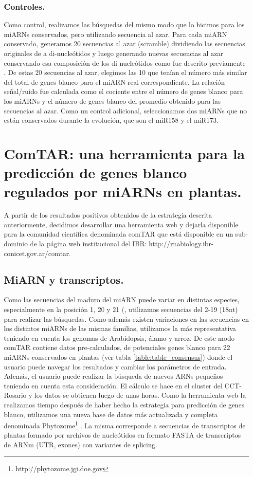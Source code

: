 \subsubsection{Controles.}
Como control, realizamos las búsquedas del mismo modo que lo hicimos para los miARNs conservados, pero utilizando secuencia al azar.
Para cada miARN conservado, generamos 20 secuencias al azar (scramble) dividiendo las secuencias originales de a di-nucleótidos y luego generando nuevas secuencias al azar conservando esa composición de los di-nucleótidos como fue descrito previamente \citep{JonesRhoades2004787}.
De estas 20 secuencias al azar, elegimos las 10 que tenían el número más similar del total de genes blanco para el miARN real correspondiente.
La relación señal/ruido fue calculada como el cociente entre el número de genes blanco para los miARNs y el número de genes blanco del promedio obtenido para las secuencias al azar.
Como un control adicional, seleccionamos dos miARNs que no están conservados durante la evolución, que son el miR158 y el miR173.


\section{ComTAR: una herramienta para la predicción de genes blanco regulados por miARNs en plantas.}

A partir de los resultados positivos obtenidos de la estrategia descrita anteriormente, decidimos desarrollar una herramienta web y dejarla disponible para la comunidad científica denominada comTAR que está disponible en un sub-dominio de la página web institucional del IBR: http://rnabiology.ibr-conicet.gov.ar/comtar.

\subsection{MiARN y transcriptos.}
Como las secuencias del maduro del miARN puede variar en distintas especies, especialmente en la posición 1, 20 y 21 (\citep{Chorostecki05072012}, utilizamos secuencias del 2-19 (18nt) para realizar las búsquedas.
Como además existen variaciones en las secuencias en los distintos miARNs de las mismas familias, utilizamos la más representativa teniendo en cuenta los genomas de Arabidopsis, álamo y arroz. 
De este modo comTAR contiene datos pre-calculados, de potenciales genes blanco para 22 miARNs conservados en plantas (ver tabla \ref{table:table_consensus}) donde el usuario puede navegar los resultados y cambiar los parámetros de entrada.
Además, el usuario puede realizar la búsqueda de nuevos ARNs pequeños teniendo en cuenta esta consideración. El cálculo se hace en el cluster del CCT-Rosario y los datos se obtienen luego de unas horas.
Como la herramienta web la realizamos tiempo después de haber hecho la estrategia para predicción de genes blanco, utilizamos una nueva base de datos más actualizada y completa denominada Phytozome\footnote{http://phytozome.jgi.doe.gov} \citep{Goodstein2012}. 
La misma corresponde a secuencias de transcriptos de plantas formado por archivos de nucleótidos en formato FASTA de transcriptos de ARNm (UTR, exones) con variantes de splicing.

